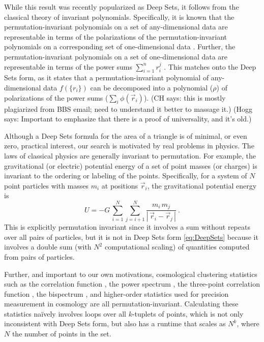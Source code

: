 \documentclass[10pt]{article}
\newcommand{\abs}[1]{|\,{#1}\,|}
\newcommand{\CH}[1]{{\color{blue} (CH says: #1)}}
\newcommand{\Hogg}[1]{{\color{violet} (Hogg says: #1)}}
\begin{document}
While this result was recently popularized as Deep Sets, it follows from the classical theory of invariant polynomials.
Specifically, it is known that the permutation-invariant polynomials on a set of any-dimensional data are representable in terms of the polarizations of the permutation-invariant polynomials on a corresponding set of one-dimensional data \citep{Weyl1939}.
Further, the permutation-invariant polynomials on a set of one-dimensional data are representable in terms of the power sums $\sum_{i=1}^{n} r_i^j$ \citep{Waring1782}.
This matches onto the Deep Sets form, as it states that a permutation-invariant polynomial of any-dimensional data $f(\{r_i\})$ can be decomposed into a polynomial ($\rho$) of polarizations of the power sums ($\sum_i \phi(\vec{r}_i)$).
\CH{this is mostly plagiarized from BBS email; need to understand it better to massage it.} \Hogg{Important to emphasize that there is a proof of universality, and it's old.}

Although a Deep Sets formula for the area of a triangle is of minimal, or even zero, practical interest, our search is motivated by real problems in physics.
The laws of classical physics are generally invariant to permutation.
For example, the gravitational (or electric) potential energy of a set of point masses (or charges) is invariant to the ordering or labeling of the points. 
Specifically, for a system of $N$ point particles with masses $m_i$ at positions $\vec{r}_i$, the gravitational potential energy is
\begin{equation}
    U = -G \, \sum_{i=1}^{N} \sum_{j=i+1}^{N} \frac{m_i \, m_j}{\abs{\vec{r}_i - \vec{r}_j}} ~.
\end{equation}
This is explicitly permutation invariant since it involves a sum without repeats over all pairs of particles, but it is not in Deep Sets form \eqref{eq:DeepSets} because it involves a double sum (with $N^2$ computational scaling) of quantities computed from pairs of particles.

Further, and important to our own motivations, cosmological clustering statistics such as 
the correlation function \citep{Peebles1973},
the power spectrum \citep{Peebles1973},
the three-point correlation function \citep{PeeblesGroth1975},
the bispectrum \citep{FrySeldner1982},
and higher-order statistics \citep{Peebles1980book}
used for precision measurement in cosmology \citep[e.g.,][]{Planck18CosmoParams,Planck18PNG,Planck18Inflation,Cabass+2022}
are all permutation-invariant.
Calculating these statistics na\"ively involves loops over all $k$-tuplets of points, which is not only inconsistent with Deep Sets form, but also has a runtime that scales as $N^k$, where $N$ the number of points in the set.
\end{document}
